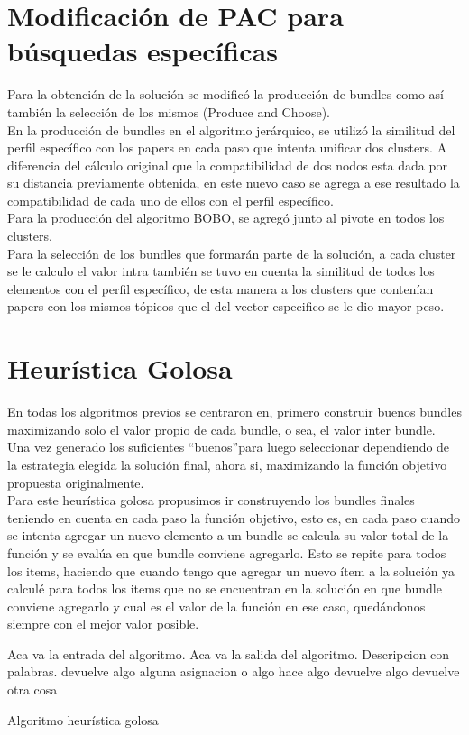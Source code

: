 \section{Modificación de PAC para búsquedas específicas}
Para la obtención de la solución se modificó la producción de bundles como así también la 
selección de los mismos (Produce and Choose). \\
En la producción de bundles en el algoritmo jerárquico, se utilizó la similitud del perfil 
específico con los papers en cada paso que intenta unificar dos clusters. A diferencia del cálculo 
original que la compatibilidad de dos nodos esta dada por su distancia previamente obtenida, en 
este nuevo caso se agrega a ese resultado la compatibilidad de cada uno de ellos con el perfil 
específico. \\
Para la producción del algoritmo BOBO, se agregó junto al pivote en todos los clusters. \\
Para la selección de los bundles que formarán parte de la solución, a cada cluster se le 
calculo el valor intra también se tuvo en cuenta la similitud de todos los elementos con el perfil  
específico, de esta manera a los clusters que contenían papers con los mismos tópicos que el del 
vector especifico se le dio mayor peso.

\section{Heurística Golosa}
En todas los algoritmos previos se centraron en, primero construir buenos bundles maximizando solo 
el valor propio de cada bundle, o sea, el valor inter bundle. Una vez generado los suficientes 
\textquotedblleft buenos\textquotedblright  para luego seleccionar dependiendo de la 
estrategia elegida la solución final, ahora si, maximizando la función objetivo propuesta 
originalmente.\\
Para este heurística golosa propusimos ir construyendo los bundles finales teniendo en cuenta en 
cada paso la función objetivo, esto es, en cada paso cuando se intenta agregar un nuevo elemento a 
un bundle se calcula su valor total de la función y se evalúa en que bundle conviene agregarlo. 
Esto se repite para todos los items, haciendo que cuando tengo que agregar un nuevo ítem a la 
solución ya calculé para todos los items que no se encuentran en la solución en que bundle conviene 
agregarlo y cual es el valor de la función en ese caso, quedándonos siempre con el mejor valor 
posible.
\begin{algorithm}[H]
\begin{algorithmic}[1]
\REQUIRE Aca va la entrada del algoritmo.
\ENSURE Aca va la salida del algoritmo.
\STATE Descripcion con palabras.
\RETURN devuelve algo
\ELSE
\STATE alguna asignacion o algo
\ENDIF
\ENDWHILE
{}
\STATE hace algo
\RETURN devuelve algo
\ENDIF
\ENDFOR
\RETURN devuelve otra cosa
\end{algorithmic}
\caption{Algoritmo heurística golosa}\label{alg:algHeuGol}
\end{algorithm}
